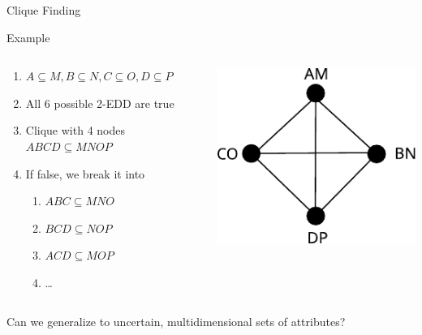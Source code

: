 \documentclass[10pt,compress]{beamer}
\begin{document}
\begin{frame}{Clique Finding}
    \begin{exampleblock}{Example}
        \begin{columns}
        \begin{column}{.7\textwidth}
        \begin{enumerate}
            \item $A \subseteq M, B \subseteq N, C \subseteq O, D \subseteq P$
            \item All 6 possible 2-EDD are true
            \item Clique with 4 nodes $ABCD \subseteq MNOP$
            \item If false, we break it into
                \begin{enumerate}
                    \item $ABC \subseteq MNO$
                    \item $BCD \subseteq NOP$
                    \item $ACD \subseteq MOP$
                    \item \ldots
                \end{enumerate}
        \end{enumerate}
        \end{column}
        \begin{column}{.3\textwidth}
            \includegraphics[width=\linewidth]{4clique}
        \end{column}
        \end{columns}
    \end{exampleblock}

    \pause
    \begin{block}{}
        \alert{Can we generalize to uncertain, multidimensional sets of attributes?}
    \end{block}
    
\end{frame}
\end{document}
